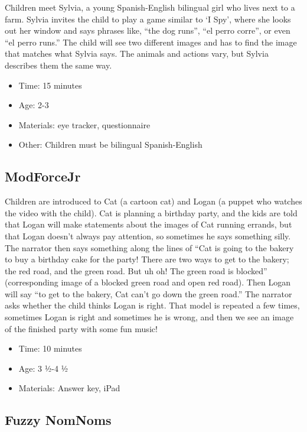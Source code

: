 \documentclass[
]{book}
\providecommand{\tightlist}{%
  \setlength{\itemsep}{0pt}\setlength{\parskip}{0pt}}
\begin{document}
Children meet Sylvia, a young Spanish-English bilingual girl who lives next to a farm. Sylvia invites the child to play a game similar to `I Spy', where she looks out her window and says phrases like, ``the dog runs'', ``el perro corre'', or even ``el perro runs.'' The child will see two different images and has to find the image that matches what Sylvia says. The animals and actions vary, but Sylvia describes them the same way.

\begin{itemize}
\tightlist
\item
  Time: 15 minutes
\item
  Age: 2-3
\item
  Materials: eye tracker, questionnaire
\item
  Other: Children must be bilingual Spanish-English
\end{itemize}

\hypertarget{modforcejr}{%
\subsection*{ModForceJr}\label{modforcejr}}

Children are introduced to Cat (a cartoon cat) and Logan (a puppet who watches the video with the child). Cat is planning a birthday party, and the kids are told that Logan will make statements about the images of Cat running errands, but that Logan doesn't always pay attention, so sometimes he says something silly. The narrator then says something along the lines of ``Cat is going to the bakery to buy a birthday cake for the party! There are two ways to get to the bakery; the red road, and the green road. But uh oh! The green road is blocked'' (corresponding image of a blocked green road and open red road). Then Logan will say ``to get to the bakery, Cat can't go down the green road.'' The narrator asks whether the child thinks Logan is right. That model is repeated a few times, sometimes Logan is right and sometimes he is wrong, and then we see an image of the finished party with some fun music!

\begin{itemize}
\tightlist
\item
  Time: 10 minutes
\item
  Age: 3 ½-4 ½
\item
  Materials: Answer key, iPad
\end{itemize}

\hypertarget{fuzzy-nomnoms}{%
\subsection*{Fuzzy NomNoms}\label{fuzzy-nomnoms}}
\end{document}
